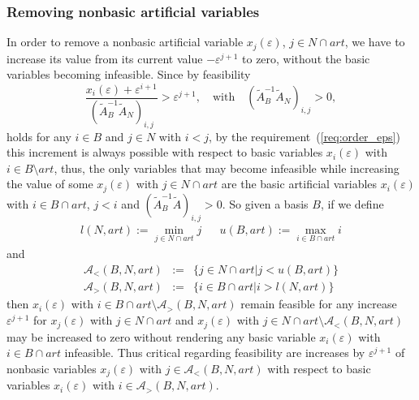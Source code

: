 \documentclass[a4paper]{article}
\newcommand{\xe}[1]{\ensuremath{x_{#1}(\varepsilon)}}
\newcommand{\cab}[3]{\ensuremath{\mathcal{A}_{>}(#1, #2, #3)}}
\newcommand{\can}[3]{\ensuremath{\mathcal{A}_{<}(#1, #2, #3)}}
\begin{document}
\subsubsection{Removing nonbasic artificial variables}
In order to remove a nonbasic artificial variable \xe{j}, $j \in N \cap art$, we
have to increase its value from its current value $-\varepsilon^{j+1}$ to zero,
without the basic variables becoming infeasible.
Since by feasibility
\begin{equation*} 
\frac{\xe{i}+ \varepsilon^{i+1}}
{\left(\tilde{A}_{B}^{-1}\tilde{A}_{N}\right)_{i, j}}
> 
\varepsilon^{j+1},
\quad \text{with} \quad \left(\tilde{A}_{B}^{-1}\tilde{A}_{N}\right)_{i, j} >0,
\end{equation*}
holds for any $i \in B$ and $j \in N$ with $i < j$,
by the requirement~(\ref{req:order_eps}) this increment is always possible
with respect to basic variables \xe{i} with
$i \in B \setminus art$, thus, the only variables
that may become infeasible while increasing the value of some
\xe{j} with $j \in N \cap art$ are the basic artificial variables
\xe{i} with $i \in B \cap art$, $j<i$ and
$(\tilde{A}_{B}^{-1}\tilde{A})_{i,j} >0$. So given a basis $B$, if we define
\begin{eqnarray}
l(N,art):=\min_{j \in N \cap art}j
&&
u(B, art):=\max_{i \in B \cap art}i
\end{eqnarray}
and
\begin{eqnarray}
\can{B}{N}{art}
&:=&
\{j \in N \cap art\left|\right. j < u(B, art)\} \\
\cab{B}{N}{art}
&:=&
\{i \in B \cap art\left|\right. i > l(N, art)\}
\end{eqnarray}
then \xe{i} with $i \in B \cap art \setminus \cab{B}{N}{art}$
remain feasible for
any increase $\varepsilon^{j+1}$ for $x_{j}(\varepsilon)$ with
$j \in N \cap art$ and \xe{j} with
$j \in N \cap art \setminus \can{B}{N}{art}$
may be increased to zero without rendering any basic variable
\xe{i} with $i \in B \cap art$ infeasible. Thus critical regarding
feasibility are increases by $\varepsilon^{j+1}$ of nonbasic variables
\xe{j} with $j \in \can{B}{N}{art}$
with respect to basic variables \xe{i} with
$i \in \cab{B}{N}{art}$.
\end{document}
